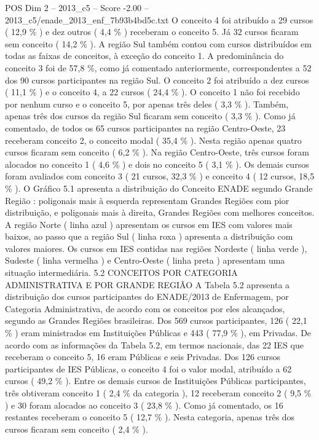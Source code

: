 \begin{textsample}{POS Dim 2 – 2013\_c5 – Score -2.00 – 2013\_c5/enade\_2013\_enf\_7b93b4bd5c.txt}
O conceito 4 foi atribuído a 29 cursos ( 12,9 \% ) e dez outros ( 4,4 \% ) receberam o conceito 5.
Já 32 cursos ficaram sem conceito ( 14,2 \% ).
A região Sul também contou com cursos distribuídos em todas as faixas de conceitos, à exceção do conceito 1.
A predominância do conceito 3 foi de 57,8 \%, como já comentado anteriormente, correspondentes a 52 dos 90 cursos participantes na região Sul.
O conceito 2 foi atribuído a dez cursos ( 11,1 \% ) e o conceito 4, a 22 cursos ( 24,4 \% ).
O conceito 1 não foi recebido por nenhum curso e o conceito 5, por apenas três deles ( 3,3 \% ).
Também, apenas três dos cursos da região Sul ficaram sem conceito ( 3,3 \% ).
Como já comentado, de todos os 65 cursos participantes na região Centro-Oeste, 23 receberam conceito 2, o conceito modal ( 35,4 \% ).
Nesta região apenas quatro cursos ficaram sem conceito ( 6,2 \% ).
Na região Centro-Oeste, três cursos foram alocados no conceito 1 ( 4,6 \% ) e dois no conceito 5 ( 3,1 \% ).
Os demais cursos foram avaliados com conceito 3 ( 21 cursos, 32,3 \% ) e conceito 4 ( 12 cursos, 18,5 \% ).
O Gráfico 5.1 apresenta a distribuição do Conceito ENADE segundo Grande Região : poligonais mais à esquerda representam Grandes Regiões com pior distribuição, e poligonais mais à direita, Grandes Regiões com melhores conceitos.
A região Norte ( linha azul ) apresentam os cursos em IES com valores mais baixos, ao passo que a região Sul ( linha roxa ) apresenta a distribuição com valores maiores.
Os cursos em IES contidas nas regiões Nordeste ( linha verde ), Sudeste ( linha vermelha ) e Centro-Oeste ( linha preta ) apresentam uma situação intermediária. 5.2 CONCEITOS POR CATEGORIA ADMINISTRATIVA E POR GRANDE REGIÃO A Tabela 5.2 apresenta a distribuição dos cursos participantes do ENADE/2013 de Enfermagem, por Categoria Administrativa, de acordo com os conceitos por eles alcançados, segundo as Grandes Regiões brasileiras.
Dos 569 cursos participantes, 126 ( 22,1 \% ) eram ministrados em Instituições Públicas e 443 ( 77,9 \% ), em Privadas.
De acordo com as informações da Tabela 5.2, em termos nacionais, das 22 IES que receberam o conceito 5, 16 eram Públicas e seis Privadas.
Dos 126 cursos participantes de IES Públicas, o conceito 4 foi o valor modal, atribuído a 62 cursos ( 49,2 \% ).
Entre os demais cursos de Instituições Públicas participantes, três obtiveram conceito 1 ( 2,4 \% da categoria ), 12 receberam conceito 2 ( 9,5 \% ) e 30 foram alocados ao conceito 3 ( 23,8 \% ).
Como já comentado, os 16 restantes receberam o conceito 5 ( 12,7 \% ).
Nesta categoria, apenas três dos cursos ficaram sem conceito ( 2,4 \% ).

\end{textsample}
